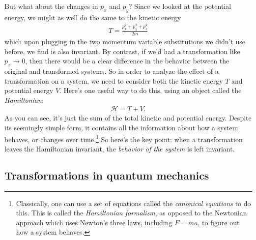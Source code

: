 But what about the changes in $p_x$ and $p_y$? Since we looked at the potential energy, we might as well do the same to the kinetic energy
\begin{align*}
    T = \frac{p_x^2 + p_y^2 + p_z^2}{2m}
\end{align*}
which upon plugging in the two momentum variable substitutions we didn't use before, we find is also invariant. By contrast, if we'd had a transformation like $p_x \rightarrow 0$, then there would be a clear difference in the behavior between the original and transformed systems. So in order to analyze the effect of a transformation on a system, we need to consider both the kinetic energy $T$ and potential energy $V$. Here's one useful way to do this, using an object called the \emph{Hamiltonian}:
\begin{align*}
    \mathscr{H} = T + V.
\end{align*}
As you can see, it's just the sum of the total kinetic and potential energy. Despite its seemingly simple form, it contains all the information about how a system behaves, or changes over time.\footnote{Classically, one can use a set of equations called the \emph{canonical equations} to do this. This is called the \emph{Hamiltonian formalism}, as opposed to the Newtonian approach which uses Newton's three laws, including $F = ma$, to figure out how a system behaves.} So here's the key point: when a transformation leaves the Hamiltonian invariant, the \emph{behavior of the system} is left invariant.

\subsection*{Transformations in quantum mechanics}


